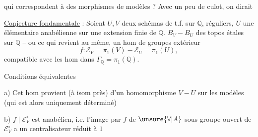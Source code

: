 qui correspondent à des morphismes de modèles ? Avec un peu de culot, on dirait

\uline{Conjecture fondamentale} : Soient $U,V$ deux schémas de t.f. sur $\mathbb{Q}$,  réguliers, $U$ une   élémentaire anabélienne sur une extension finie de $\mathbb{Q}$.     $B_V-B_U$ des topos étales sur $\mathbb{Q}$ -- ou ce qui revient au même, un hom de groupes extérieur
\[
f:\mathcal E_V=\pi_1(V)-\mathcal E_U=\pi_1(U),
\]
compatible avec les hom dans $\Gamma_{\mathbb{Q}}=\pi_1(\mathbb{Q})$.

Conditions équivalentes

 a) Cet hom provient (à isom près) d'un homomorphisme $V-U$ sur les modèles (qui est alors uniquement déterminé)

 b) $f\mid\mathcal E_V^\circ$ est anabélien, i.e. l'image par $f$ de $\unsure{\forall|A}$ sous-groupe ouvert de $\mathcal E_V^\circ$ a un centralisateur réduit à $1$

